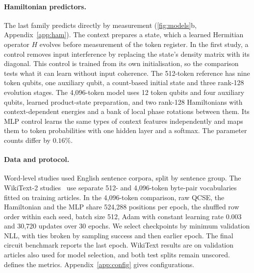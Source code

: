 \documentclass[11pt,a4paper]{article}
\begin{document}
\paragraph{Hamiltonian predictors.}
The last family predicts directly by measurement (\cref{fig:models}b, Appendix~\ref{app:ham}). The context prepares a state, which a learned Hermitian operator $H$ evolves before measurement of the token register. In the first study, a control removes input interference by replacing the state's density matrix with its diagonal. This control is trained from its own initialisation, so the comparison tests what it can learn without input coherence. The 512-token reference has nine token qubits, one auxiliary qubit, a count-based initial state and three rank-128 evolution stages. The 4,096-token model uses 12 token qubits and four auxiliary qubits, learned product-state preparation, and two rank-128 Hamiltonians with context-dependent energies and a bank of local phase rotations between them. Its MLP control learns the same types of context features independently and maps them to token probabilities with one hidden layer and a softmax. The parameter counts differ by $0.16\%$.

\paragraph{Data and protocol.}
Word-level studies used English sentence corpora, split by sentence group. The WikiText-2 studies~\cite{merity2016} use separate 512- and 4,096-token byte-pair vocabularies fitted on training articles. In the 4,096-token comparison, raw QCSE, the Hamiltonian and the MLP share 524,288 positions per epoch, the shuffled row order within each seed, batch size 512, Adam with constant learning rate 0.003 and 30,720 updates over 30 epochs. We select checkpoints by minimum validation NLL, with ties broken by sampling success and then earlier epoch. The final circuit benchmark reports the last epoch. WikiText results are on validation articles also used for model selection, and both test splits remain unscored.  defines the metrics. Appendix~\ref{app:config} gives configurations.
\end{document}
